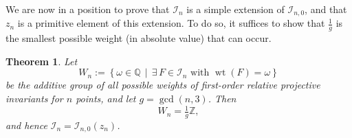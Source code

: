 \documentclass[12pt,reqno]{amsart}
\newtheorem{theorem}{Theorem}
\begin{document}
	
We are now in a position to prove that \( \mathcal{I}_n \) is a simple extension of \( \mathcal{I}_{n,0} \), and that \( z_n \) is a primitive element of this extension.  
To do so, it suffices to show that \( \tfrac{1}{g} \) is the smallest possible weight (in absolute value) that can occur.

\begin{theorem}
Let
\[
W_n := \left\{ \omega \in \mathbb{Q} \,\middle|\, \exists\, F \in \mathcal{I}_n \text{ with } \operatorname{wt}(F) = \omega \right\}
\]
be the additive group of all possible weights of first-order relative projective invariants for \( n \) points, and let \( g = \gcd(n, 3) \). Then
\[
W_n = \tfrac{1}{g} \mathbb{Z},
\]
and hence \( \mathcal{I}_n = \mathcal{I}_{n,0}(z_n) \).
\end{theorem}
\end{document}
